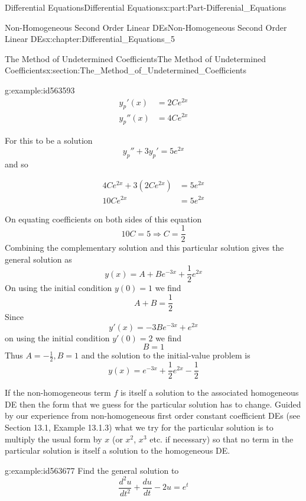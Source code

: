\documentclass[oneside,10pt,]{book}
\numberwithin{equation}{section}
\newcommand{\amp}{&}
\begin{document}
\begin{partptx}{Differential Equations}{}{Differential Equations}{}{}{x:part:Part-Differenial_Equations}
\begin{chapterptx}{Non-Homogeneous Second Order Linear DEs}{}{Non-Homogeneous Second Order Linear DEs}{}{}{x:chapter:Differential_Equations_5}
\begin{sectionptx}{The Method of Undetermined Coefficients}{}{The Method of Undetermined Coefficients}{}{}{x:section:The_Method_of_Undetermined_Coefficients}
\begin{example}{}{g:example:id563593}
\begin{align*}
y_p'(x) \amp =2Ce^{2x}\\
y_p''(x) \amp=4Ce^{2x}
\end{align*}
%
\par
For this to be a solution%
\begin{equation*}
y_p''+3y_p'=5e^{2x}
\end{equation*}
and so%
\par
%
\begin{align*}
4Ce^{2x}+3(2Ce^{2x}) \amp =5e^{2x}\\
10Ce^{2x} \amp=5e^{2x}
\end{align*}
%
\par
On equating coefficients on both sides of this equation%
\begin{equation*}
10C=5\Rightarrow C=\frac{1}{2}
\end{equation*}
Combining the complementary solution and this particular solution gives the general solution as%
\begin{equation*}
y(x)=A+Be^{-3x}+\frac{1}{2}e^{2x}
\end{equation*}
On using the initial condition \(y(0)=1\) we find%
\begin{equation*}
A+B=\frac{1}{2}
\end{equation*}
Since%
\begin{equation*}
y'(x)=-3Be^{-3x}+e^{2x}
\end{equation*}
on using the initial condition \(y'(0)=2\) we find%
\begin{equation*}
B=1
\end{equation*}
Thus \(A=-\frac{1}{2}, B=1\) and the solution to the initial-value problem is%
\begin{equation*}
y(x)=e^{-3x}+\frac{1}{2}e^{2x}-\frac{1}{2}
\end{equation*}
%
\end{example}
If the non-homogeneous term \(f\) is itself a solution to the associated homogeneous DE then the form that we guess for the particular solution has to change. Guided by our experience from non-homogeneous first order constant coefficient DEs (see Section 13.1, Example 13.1.3) what we try for the particular solution is to multiply the usual form by \(x\) (or \(x^2\), \(x^3\) etc. if necessary) so that no term in the particular solution is itself a solution to the homogeneous DE.%
\begin{example}{}{g:example:id563677}%
Find the general solution to%
\begin{equation*}
\frac{d^2u}{dt^2}+\frac{du}{dt}-2u=e^t
\end{equation*}

\end{example}
\end{sectionptx}
\end{chapterptx}
\end{partptx}
\end{document}
